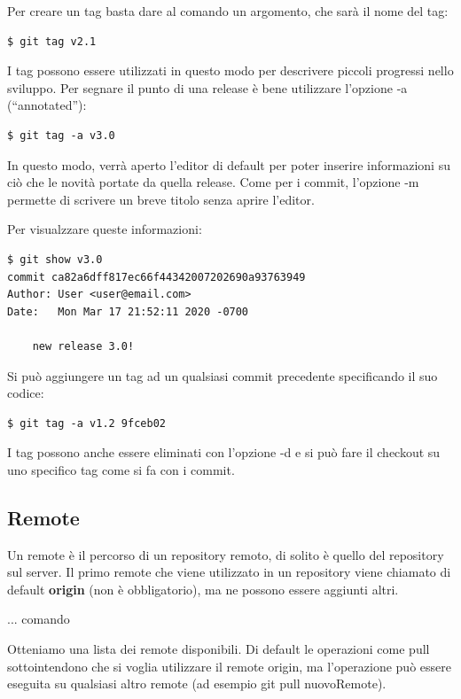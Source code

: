 \documentclass{article} \usepackage[textwidth=19cm,textheight=24cm]{geometry}
\begin{document}
Per creare un tag basta dare al comando un argomento, che sarà il nome del tag:

\begin{verbatim}
$ git tag v2.1
\end{verbatim}

I tag possono essere utilizzati in questo modo per descrivere piccoli progressi
nello sviluppo. Per segnare il punto di una release è bene utilizzare l'opzione
-a (``annotated''): 

\begin{verbatim}
$ git tag -a v3.0
\end{verbatim}

In questo modo, verrà aperto l'editor di default per poter inserire informazioni
su ciò che le novità portate da quella release. Come per i commit, l'opzione -m
permette di scrivere un breve titolo senza aprire l'editor.

Per visualzzare queste informazioni:

\begin{verbatim}
$ git show v3.0
commit ca82a6dff817ec66f44342007202690a93763949
Author: User <user@email.com>
Date:   Mon Mar 17 21:52:11 2020 -0700

    new release 3.0!
\end{verbatim}

Si può aggiungere un tag ad un qualsiasi commit precedente specificando il suo
codice:

\begin{verbatim}
$ git tag -a v1.2 9fceb02
\end{verbatim}

I tag possono anche essere eliminati con l'opzione -d e si può fare il checkout
su uno specifico tag come si fa con i commit.

\subsection{Remote\label{remoti}}

Un remote è il percorso di un repository remoto, di solito è quello del
repository sul server. Il primo remote che viene utilizzato in un repository
viene chiamato di default \textbf{origin} (non è obbligatorio), ma ne possono
essere aggiunti altri.

... comando

Otteniamo una lista dei remote disponibili. Di default le operazioni come pull
sottointendono che si voglia utilizzare il remote origin, ma l'operazione può
essere eseguita su qualsiasi altro remote (ad esempio git pull nuovoRemote).
\end{document}
